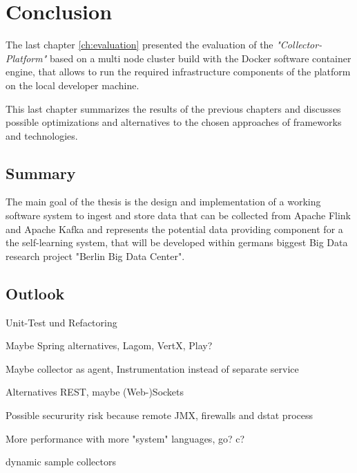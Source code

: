 \chapter{Conclusion}
\label{ch:conclusion}

The last chapter \autoref{ch:evaluation} presented the evaluation of the \textit{"Collector-Platform"} based on a multi node cluster
build with the Docker software container engine, that allows to run the required infrastructure components of the platform
on the local developer machine.

This last chapter summarizes the results of the previous chapters and discusses possible optimizations and alternatives to
the chosen approaches of frameworks and technologies.

\section{Summary}

The main goal of the thesis is the design and implementation of a working software system
to ingest and store data that can be collected from Apache Flink and Apache Kafka and
represents the potential data providing component for a the self-learning system, that will be developed within
germans biggest Big Data research project "Berlin Big Data Center".




\section{Outlook}

Unit-Test und Refactoring

Maybe Spring alternatives, Lagom, VertX, Play?

Maybe collector as agent, Instrumentation instead of separate service

Alternatives REST, maybe (Web-)Sockets

Possible secururity risk because remote JMX, firewalls and dstat process

More performance with more "system" languages, go? c?

dynamic sample collectors
